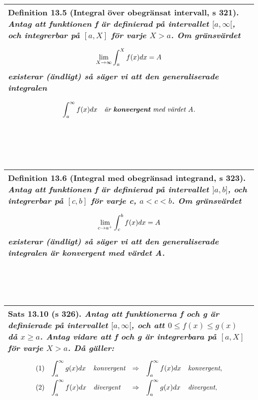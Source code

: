 \documentclass[a4paper]{article}
\begin{document}
\begin{tabular}{|L{11.5cm}|} \hline
\textbf{Definition 13.5} (Integral över obegränsat intervall, s 321).
\textit{Antag att funktionen f är definierad på intervallet $[a,\infty[$, och integrerbar på $[a,X]$ för varje $X>a$. Om gränsvärdet}
\begin{equation*}
\renewcommand{\arraystretch}{2.5}
\begin{array}{>{\displaystyle}c}
\lim\limits_{X\to \infty}\int_{a}^{X}f(x)dx=A
\end{array}
\end{equation*}
\textit{existerar (ändligt) så säger vi att den \textbf{generaliserade integralen}}
\begin{equation*}
\renewcommand{\arraystretch}{2.5}
\begin{array}{>{\displaystyle}cc}
\int_{a}^{\infty}f(x)dx & \textit{är \textbf{konvergent} med värdet A.}
\end{array}
\end{equation*}
\\\hline
\end{tabular}
\\\\\\
\begin{tabular}{|L{11.5cm}|} \hline
\textbf{Definition 13.6} (Integral med obegränsad integrand, s 323).
\textit{Antag att funktionen f är definierad på intervallet $]a,b]$, och integrerbar på $[c,b]$ för varje c, $a<c<b$. Om gränsvärdet}
\begin{equation*}
\renewcommand{\arraystretch}{2.5}
\begin{array}{>{\displaystyle}c}
\lim\limits_{c\to a^+}\int_{c}^{b}f(x)dx=A
\end{array}
\end{equation*}
\textit{existerar (ändligt) så säger vi att den generaliserade integralen är \textbf{konvergent} med värdet A.}
\\\hline
\end{tabular}
\\\\\\
\begin{tabular}{|L{11.5cm}|} \hline
\textbf{Sats 13.10} (s 326).
\textit{Antag att funktionerna f och g är definierade på intervallet $[a,\infty [$, och att $0\leq f(x) \leq g(x)$ då $x\geq a$. Antag vidare att f och g är integrerbara på $[a,X]$ för varje $X>a$. Då gäller:}
\begin{equation*}
\renewcommand{\arraystretch}{2.2}
\begin{array}{l>{\displaystyle}l>{\displaystyle}l>{\displaystyle}l>{\displaystyle}l>{\displaystyle}l}
(1) & \int_{a}^{\infty}g(x)dx & \textit{konvergent} & \Rightarrow & \int_{a}^{\infty}f(x)dx & \textit{konvergent}, \\
(2) & \int_{a}^{\infty}f(x)dx & \textit{divergent} & \Rightarrow & \int_{a}^{\infty}g(x)dx & \textit{divergent}, \\
\end{array}
\end{equation*}
\\\hline
\end{tabular}
\end{document}

